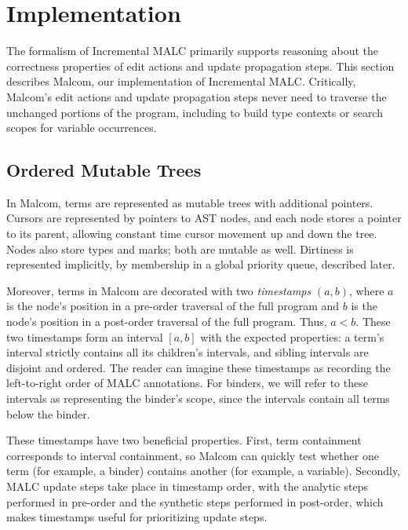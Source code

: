 
\section{Implementation}%
\label{sec:Implementation}

The formalism of Incremental MALC primarily supports reasoning about the correctness properties of edit actions and update propagation steps. This section describes Malcom, our implementation of Incremental MALC. Critically, Malcom's edit actions and update propagation steps never need to traverse the unchanged portions of the program, including to build type contexts or search scopes for variable occurrences.

\subsection{Ordered Mutable Trees}

In Malcom, terms are represented as mutable trees with additional pointers. Cursors are represented by pointers to AST nodes, and each node stores a pointer to its parent, allowing constant time cursor movement up and down the tree. Nodes also store types and marks; both are mutable as well. Dirtiness is represented implicitly, by membership in a global priority queue, described later.

Moreover, terms in Malcom are decorated with two \emph{timestamps} $(a, b)$, where $a$ is the node's position in a pre-order traversal of the full program and $b$ is the node's position in a post-order traversal of the full program. Thus, $a < b$. These two timestamps form an interval $[a, b]$ with the expected properties: a term's interval strictly contains all its children's intervals, and sibling intervals are disjoint and ordered. The reader can imagine these timestamps as recording the left-to-right order of MALC annotations. For binders, we will refer to these intervals as representing the binder's scope, since the intervals contain all terms below the binder.

These timestamps have two beneficial properties. First, term containment corresponds to interval containment, so Malcom can quickly test whether one term (for example, a binder) contains another (for example, a variable). Secondly, MALC update steps take place in timestamp order, with the analytic steps performed in pre-order and the synthetic steps performed in post-order, which makes timestamps useful for prioritizing update steps.

